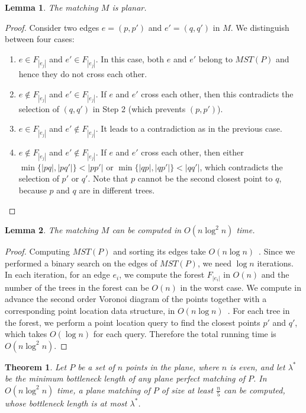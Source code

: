 \documentclass[11pt,a4paper]{article}
\newcommand{\btopt}{\lambda^*}
\newtheorem{lemma}{Lemma}
\newtheorem{theorem}{Theorem}
\begin{document}
\begin{lemma}
\label{planarity}
 The matching $M$ is planar.
\end{lemma}
\begin{proof}
Consider two edges $e=(p,p')$ and $e'=(q,q')$ in $M$. We distinguish between four cases:
\begin{enumerate}
   \item $e\in F_{|e_j|}$ and $e' \in F_{|e_j|}$. In this case, both $e$ and $e'$ belong to $MST(P)$ and hence they do not cross each other.
  \item $e\notin F_{|e_j|}$ and $e'\in F_{|e_j|}$. If $e$ and $e'$ cross each other, then this contradicts the selection of $(q,q')$ in Step 2 (which prevents $(p,p')$).
  \item $e\in F_{|e_j|}$ and $e'\notin F_{|e_j|}$. It leads to a contradiction as in the previous case.
  \item $e\notin F_{|e_j|}$ and $e'\notin F_{|e_j|}$. If $e$ and $e'$ cross each other, then either $\min\{|pq|,|pq'|\} < |pp'|$ or $\min\{|qp|,|qp'|\} < |qq'|$, which contradicts the selection of $p'$ or $q'$. Note that $p$ cannot be the second closest point to $q$, because $p$ and $q$ are in different trees. 
\end{enumerate} 
\end{proof}


\begin{lemma}
\label{running-time}
 The matching $M$ can be computed in $O(n\log^2 n)$ time.
\end{lemma}
\begin{proof}
Computing $MST(P)$ and sorting its edges take $O(n\log{n})$~\cite{deBerg08}. Since we performed a binary search on the edges of $MST(P)$, we need $\log{n}$ iterations. In each iteration, for an edge $e_i$, we compute the forest $F_{|e_i|}$ in $O(n)$ and the number of the trees in the forest can be $O(n)$ in the worst case. We compute in advance the second order Voronoi diagram of the points together with a corresponding point location data structure, in $O(n\log{n})$~\cite{deBerg08}. For each tree in the forest, we perform a point location query to find the closest points $p'$ and $q'$, which takes $O(\log{n})$ for each query. Therefore the total running time is $O(n\log^2{n})$.
\end{proof}

\begin{theorem}
\label{two-over-five-theorem-2}
Let $P$ be a set of $n$ points in the plane, where $n$ is even, and let $\btopt$ be the minimum bottleneck length of any plane perfect matching of $P$. In $O(n\log^2 n)$ time, a plane matching of $P$ of size at least $\frac{n}{5}$ can be computed, whose bottleneck length is at most $\btopt$.
\end{theorem}
\end{document}
